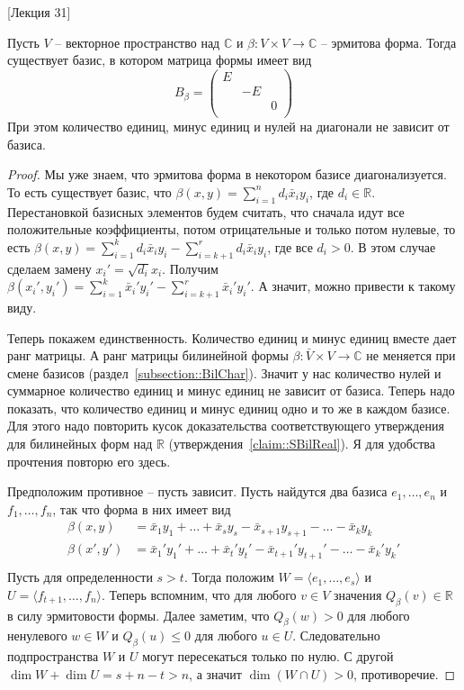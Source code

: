 [Лекция 31]

\begin{claim}
Пусть $V$ -- векторное пространство над $\mathbb C$ и $\beta\colon V\times V\to\mathbb C$ -- эрмитова форма. Тогда существует базис, в котором матрица формы имеет вид
\[
B_\beta = 
\begin{pmatrix}
{E}&{}&{}\\
{}&{-E}&{}\\
{}&{}&{0}\\
\end{pmatrix}
\]
При этом количество единиц, минус единиц и нулей на диагонали не зависит от базиса.
\end{claim}
\begin{proof}
Мы уже знаем, что эрмитова форма в некотором базисе диагонализуется. То есть существует базис, что $\beta(x, y) = \sum_{i=1}^n d_i \bar x_i y_i$, где $d_i\in \mathbb R$. Перестановкой базисных элементов будем считать, что сначала идут все положительные коэффициенты, потом отрицательные и только потом нулевые, то есть $\beta(x,y) = \sum_{i=1}^k d_i \bar x_i y_i - \sum_{i=k+1}^r d_i \bar x_i y_i$, где все $d_i > 0$. В этом случае сделаем замену $x_i' = \sqrt{d_i}x_i$. Получим $\beta(x_i',y_i') = \sum_{i=1}^k \bar x_i' y_i' - \sum_{i=k+1}^r \bar x_i' y_i'$. А значит, можно привести к такому виду.


Теперь покажем единственность. Количество единиц и минус единиц вместе дает ранг матрицы. А ранг матрицы билинейной формы $\beta\colon \bar V\times V\to \mathbb C$ не меняется при смене базисов (раздел~\ref{subsection::BilChar}). Значит у нас количество нулей и суммарное количество единиц и минус единиц не зависит от базиса. Теперь надо показать, что количество единиц и минус единиц одно и то же в каждом базисе. Для этого надо повторить кусок доказательства соответствующего утверждения для билинейных форм над $\mathbb R$ (утверждения~\ref{claim::SBilReal}). Я для удобства прочтения повторю его здесь.


Предположим противное -- пусть зависит. Пусть найдутся два базиса $e_1,\ldots,e_n$ и $f_1,\ldots,f_n$, так что форма в них имеет вид
\begin{align*}
\beta(x, y) &= \bar x_1y_1+\ldots +\bar x_s y_s - \bar x_{s+1}y_{s+1} - \ldots - \bar x_k y_k\\
\beta(x',y') &= \bar x_1'y_1'+\ldots +\bar x_t' y_t' - \bar x_{t+1}' y_{t+1}' - \ldots - \bar x_k' y_k'\\
\end{align*}
Пусть для определенности $s > t$. Тогда положим $W = \langle e_1,\ldots, e_s\rangle$ и $U = \langle f_{t+1},\ldots, f_n\rangle$. Теперь вспомним, что для любого $v\in V$ значения $Q_\beta(v)\in \mathbb R$ в силу эрмитовости формы. Далее заметим, что $Q_\beta(w) > 0$ для любого ненулевого $w\in W$ и $Q_\beta(u) \leqslant 0$ для любого $u\in U$. Следовательно подпространства $W$ и $U$ могут пересекаться только по нулю. С другой $\dim W+\dim U = s + n - t > n$, а значит $\dim(W\cap U) > 0$, противоречие.
\end{proof}

